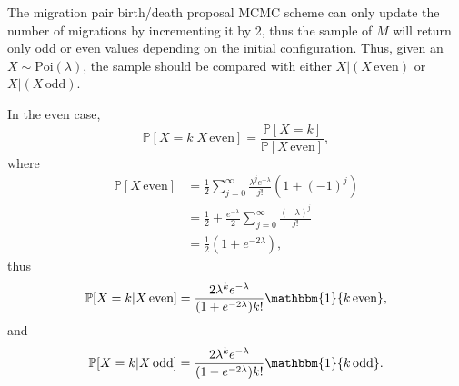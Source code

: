 \documentclass[12pt,a4paper]{article}
\newcommand{\bbP}{\mathbb{P}}
\begin{document}
				The migration pair birth/death proposal MCMC scheme can only update the number of migrations by incrementing it by 2, thus the sample of $M$ will return only odd or even values depending on the initial configuration. Thus, given an $X \sim \text{Poi}(\lambda)$, the sample should be compared with either $X | (X \, \text{even})$ or $X | (X \, \text{odd} )$.
				
				In the even case,
					\[
						\bbP [X = k | X \, \text{even}] = \frac{\bbP[X = k]}{\bbP[X \, \text{even}]},
					\]
				where
					\begin{align*}
						\bbP[X \, \text{even}] & = \frac{1}{2} \sum_{j=0}^\infty \frac{\lambda^{j} e^{-\lambda}}{j!} (1 + (-1)^j) \\
							& = \frac{1}{2} + \frac{e^{-\lambda}}{2} \sum_{j=0}^\infty \frac{(-\lambda)^j}{j!} \\
							& = \frac{1}{2}(1 + e^{-2 \lambda}),
					\end{align*}
				thus
					\[
						\bbP [X = k | X \, \text{even}] = \frac{2\lambda^k e^{-\lambda}}{(1 + e^{-2 \lambda}) k!} \mathbbm{1} \{k \, \text{even} \},
					\]
				and
					\[
					\bbP [X = k | X \, \text{odd}] = \frac{2\lambda^k e^{-\lambda}}{(1 - e^{-2 \lambda}) k!} \mathbbm{1} \{k \, \text{odd} \}.
					\]
					
\end{document}
